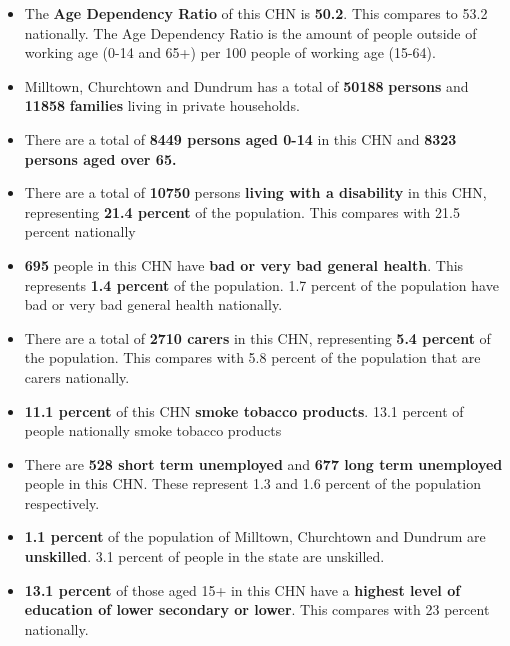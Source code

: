 \documentclass{article}
\begin{document}
\begin{itemize}

\item The \textbf{Age Dependency Ratio} of this CHN is  \textbf{50.2}. This compares to 53.2 nationally. The Age Dependency Ratio is the amount of people outside of working age (0-14 and 65+) per 100 people of working age (15-64). 

\item Milltown, Churchtown and Dundrum has a total of \textbf{\num{50188}} \textbf{persons} and  \textbf{\num{11858}} \textbf{families} living in private households.

\item There are a total of \textbf{\num{8449} persons aged 0-14} in this CHN and \textbf{\num{8323} persons aged over 65.} 

\item There are a total of \textbf{\num{10750}} persons \textbf{living with a disability} in this CHN, representing \textbf{21.4 percent} of the population. This compares with  21.5 percent nationally

\item \textbf{\num{695}} people in this CHN have \textbf{bad or very bad general health}. This represents \textbf{1.4 percent} of the population. 1.7 percent of the population have bad or very bad general health nationally. 

\item There are a total of \textbf{\num{2710} carers} in this CHN, representing \textbf{5.4 percent} of the population. This compares with 5.8 percent of the population that are carers nationally. 

\item \textbf{11.1 percent} of this CHN \textbf{smoke tobacco products}. 13.1 percent of people nationally smoke tobacco products

\item There are \textbf{\num{528} short term unemployed} and \textbf{\num{677} long term unemployed} people in this CHN. These represent 1.3 and 1.6 percent of the population respectively.

\item  \textbf{1.1 percent} of the population of Milltown, Churchtown and Dundrum are \textbf{unskilled}. 3.1 percent of people in the state are unskilled.

\item \textbf{13.1 percent} of those aged 15+ in this CHN have a \textbf{highest level of education of lower secondary or lower}. This compares with 23 percent nationally. 


\end{itemize}
\end{document}

